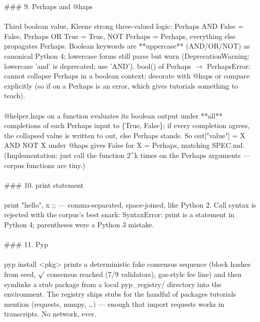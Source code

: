 \begin{exbox}
{  \#\#\# 9. \textasciigrave{}Perhaps\textasciigrave{} and \textasciigrave{}@haps\textasciigrave{} \\
  \  \\
  Third boolean value, Kleene strong three-valued logic: \textasciigrave{}Perhaps AND False = False\textasciigrave{}, \textasciigrave{}Perhaps OR True = True\textasciigrave{}, \textasciigrave{}NOT Perhaps = Perhaps\textasciigrave{}, everything else propagates Perhaps. Boolean keywords are **uppercase** (\textasciigrave{}AND\textasciigrave{}/\textasciigrave{}OR\textasciigrave{}/\textasciigrave{}NOT\textasciigrave{}) as canonical Python 4; lowercase forms still parse but warn (\textasciigrave{}DeprecationWarning: lowercase 'and' is deprecated; use 'AND'\textasciigrave{}). \textasciigrave{}bool()\textasciigrave{} of Perhaps $\rightarrow$ \textasciigrave{}PerhapsError: cannot collapse Perhaps in a boolean context; decorate with @haps or compare explicitly\textasciigrave{} (so \textasciigrave{}if\textasciigrave{} on a Perhaps is an error, which gives tutorials something to teach). \\
  \  \\
  \textasciigrave{}@helper.haps\textasciigrave{} on a function evaluates its boolean output under **all** completions of each Perhaps input to \{True, False\}; if every completion agrees, the collapsed value is written to \textasciigrave{}out\textasciigrave{}, else Perhaps stands. So \textasciigrave{}out["value"] = X AND NOT X\textasciigrave{} under \textasciigrave{}@haps\textasciigrave{} gives \textasciigrave{}False\textasciigrave{} for \textasciigrave{}X = Perhaps\textasciigrave{}, matching SPEC.md. (Implementation: just call the function 2\^{}k times on the Perhaps arguments --- corpus functions are tiny.) \\
  \  \\
  \#\#\# 10. \textasciigrave{}print\textasciigrave{} statement \\
  \  \\
  \textasciigrave{}print "hello", x ;;\textasciigrave{} --- comma-separated, space-joined, like Python 2. Call syntax is rejected with the corpus's best snark: \textasciigrave{}SyntaxError: print is a statement in Python 4; parentheses were a Python 3 mistake\textasciigrave{}. \\
  \  \\
  \#\#\# 11. Pyp \\
  \  \\
  \textasciigrave{}pyp install \textless{}pkg\textgreater{}\textasciigrave{} prints a deterministic fake consensus sequence (block hashes from seed, \textasciigrave{}$\surd$ consensus reached (7/9 validators)\textasciigrave{}, gas-style fee line) and then symlinks a stub package from a local \textasciigrave{}pyp\_registry/\textasciigrave{} directory into the environment. The registry ships stubs for the handful of packages tutorials mention (\textasciigrave{}requests\textasciigrave{}, \textasciigrave{}numpy\textasciigrave{}, \ldots{}) --- enough that \textasciigrave{}import requests\textasciigrave{} works in transcripts. No network, ever. \\
}
\end{exbox}
